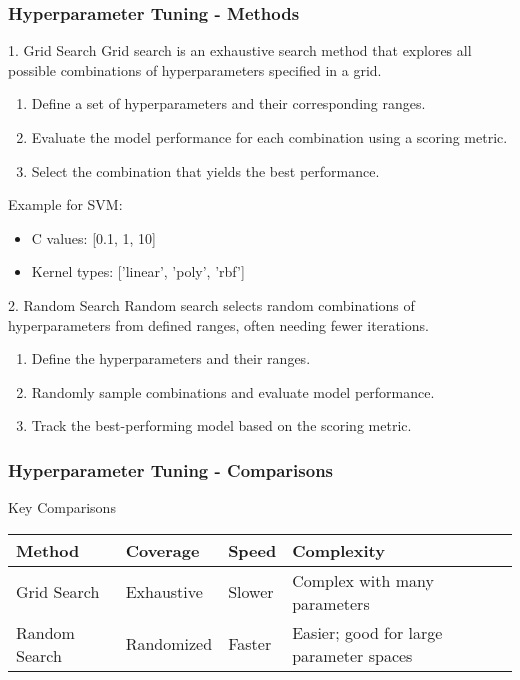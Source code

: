 \documentclass[aspectratio=169]{beamer}
\begin{document}
\begin{frame}[fragile]
    \frametitle{Hyperparameter Tuning - Methods}
    \begin{block}{1. Grid Search}
        Grid search is an exhaustive search method that explores all possible combinations of hyperparameters specified in a grid.
        \begin{enumerate}
            \item Define a set of hyperparameters and their corresponding ranges.
            \item Evaluate the model performance for each combination using a scoring metric.
            \item Select the combination that yields the best performance.
        \end{enumerate}
        \begin{example}
            Example for SVM:
            \begin{itemize}
                \item C values: [0.1, 1, 10]
                \item Kernel types: ['linear', 'poly', 'rbf']
            \end{itemize}
        \end{example}
    \end{block}

    \begin{block}{2. Random Search}
        Random search selects random combinations of hyperparameters from defined ranges, often needing fewer iterations. 
        \begin{enumerate}
            \item Define the hyperparameters and their ranges.
            \item Randomly sample combinations and evaluate model performance.
            \item Track the best-performing model based on the scoring metric.
        \end{enumerate}
    \end{block}
\end{frame}

\begin{frame}[fragile]
    \frametitle{Hyperparameter Tuning - Comparisons}
    \begin{block}{Key Comparisons}
        \begin{tabular}{|l|l|l|l|}
            \hline
            Method & Coverage & Speed & Complexity \\
            \hline
            Grid Search & Exhaustive & Slower & Complex with many parameters \\
            Random Search & Randomized & Faster & Easier; good for large parameter spaces \\
            \hline
        \end{tabular}
    \end{block}
\end{frame}
\end{document}
